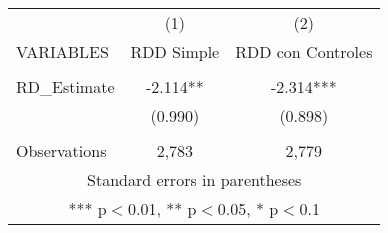 \begin{tabular}{lcc} \hline
 & (1) & (2) \\
VARIABLES & RDD Simple & RDD con Controles \\ \hline
 &  &  \\
RD\_Estimate & -2.114** & -2.314*** \\
 & (0.990) & (0.898) \\
 &  &  \\
 Observations & 2,783 & 2,779 \\ \hline
\multicolumn{3}{c}{ Standard errors in parentheses} \\
\multicolumn{3}{c}{ *** p$<$0.01, ** p$<$0.05, * p$<$0.1} \\
\end{tabular}
